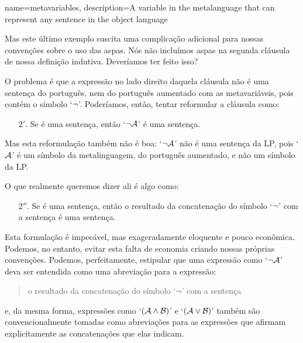 {
name=metavariables,
description={A variable in the metalanguage that can represent any sentence in the object language}
}

Mas este último exemplo suscita uma complicação adicional para nossas convenções sobre o uso das aspas.
Nós não incluímos aspas na segunda cláusula de nossa definição indutiva. Deveríamos ter feito isso?

O problema é que a expressão no lado direito daquela cláusula não é uma sentença do português, nem do português aumentado com as metavariáveis, pois contém o símbolo `$\neg$'.
Poderíamos, então, tentar reformular a cláusula como:
	\begin{enumerate}
		\item[2$'$.] Se  é uma sentença, então `$\neg \mathcal{A}$' é uma sentença.
	\end{enumerate}
Mas esta reformulação também não é boa:
`$\neg\mathcal{A}$' não é uma sentença da LP, pois `$\mathcal{A}$' é um símbolo da metalinguagem, do português aumentado, e não um símbolo da LP.

O que realmente queremos dizer ali é algo como:
	\begin{enumerate}
		\item[2$''$.] Se  é uma sentença, então o resultado da concatenação do símbolo `$\neg$' com a sentença  é uma sentença.
	\end{enumerate}
Esta formulação é impecável, mas exageradamente eloquente e pouco econômica.
Podemos, no entanto, evitar esta falta de economia criando nossas próprias convenções.
Podemos, perfeitamente, estipular que uma expressão como `$\neg\mathcal{A}$' deva ser entendida como uma abreviação para a expressão:
\begin{quote}
	o resultado da concatenação do símbolo `$\neg$' com a sentença 
\end{quote}
e, da mesma forma, expressões como `$(\mathcal{A} \wedge \mathcal{B})$' e `$(\mathcal{A} \vee \mathcal{B})$' também são convencionalmente tomadas como abreviações para as expressões que afirmam explicitamente as concatenações que elas indicam.


